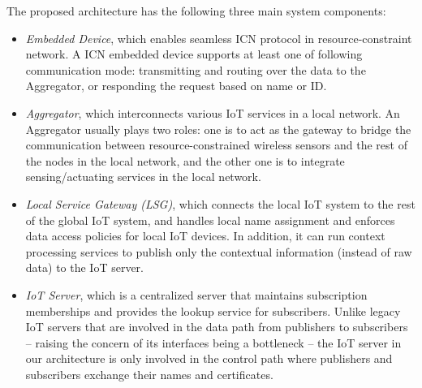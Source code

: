 The proposed architecture has the following three main system components:
\begin{itemize}
\item{\em Embedded Device}, which enables seamless ICN protocol in resource-constraint network. A ICN embedded device supports at least one of following communication mode: transmitting and routing over the data to the Aggregator, or responding the request based on name or ID. 
\item{\em Aggregator}, which interconnects various IoT services in a local network. An Aggregator usually plays two roles: one is to act as the gateway to bridge the communication between resource-constrained wireless sensors and the rest of the nodes in the local network,  and the other one is to integrate sensing/actuating services in the local network.


\item{\em Local Service Gateway (LSG)}, which connects the local IoT system to the rest of the global IoT system, and handles local name assignment and enforces  data access policies for local IoT devices. In addition, it can run context processing services to publish only the contextual information (instead of raw data) to the IoT server.

\item{\em IoT Server}, which is a centralized server that maintains subscription memberships and provides the lookup service for subscribers. Unlike legacy IoT servers that are involved in the data path from publishers to subscribers -- raising the concern of its interfaces being a bottleneck -- the IoT server in our architecture is only involved in the control path where publishers and subscribers exchange their names and certificates.

\end{itemize}

